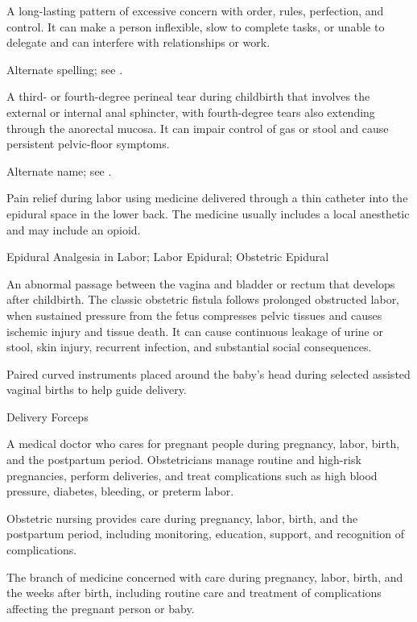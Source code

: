  A long-lasting pattern of excessive concern with order, rules, perfection, and control. It can make a person inflexible, slow to complete tasks, or unable to delegate and can interfere with relationships or work.

 Alternate spelling; see .

 A third- or fourth-degree perineal tear
during childbirth that involves the external or internal anal sphincter, with
fourth-degree tears also extending through the anorectal mucosa. It can impair
control of gas or stool and cause persistent pelvic-floor symptoms.

 Alternate name; see .

 Pain relief during labor using medicine delivered through a thin catheter into the epidural space in the lower back. The medicine usually includes a local anesthetic and may include an opioid.

\synonyms
Epidural Analgesia in Labor; Labor Epidural; Obstetric Epidural

 An abnormal passage between the vagina and bladder or rectum that develops after childbirth.
The classic obstetric fistula follows prolonged obstructed labor, when sustained pressure from the fetus compresses
pelvic tissues and causes ischemic injury and tissue death. It can cause continuous leakage of urine or stool,
skin injury, recurrent infection, and substantial social consequences.

 Paired curved instruments placed around the baby's head during selected assisted vaginal births to help guide delivery.

\synonyms
Delivery Forceps

 A medical doctor who cares for pregnant people during pregnancy, labor, birth, and the postpartum period. Obstetricians manage routine and high-risk pregnancies, perform deliveries, and treat complications such as high blood pressure, diabetes, bleeding, or preterm labor.

 Obstetric nursing provides care during pregnancy, labor, birth, and the postpartum period, including monitoring, education, support, and recognition of complications.

 The branch of medicine concerned with care during pregnancy, labor, birth, and the weeks after birth, including routine care and treatment of complications affecting the pregnant person or baby.


